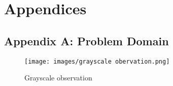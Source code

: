 \documentclass{article}
\begin{document}

\newpage
\section*{Appendices}
\subsection*{Appendix A: Problem Domain}
\label{sec:problem_domain}
\begin{figure}[h!]
    \centering
    \texttt{[image: images/grayscale obervation.png]}
    \caption{Grayscale observation~\cite{leurent_social_2019}}
    \label{appendix:grayscale-observation}
\end{figure}

\end{document}
